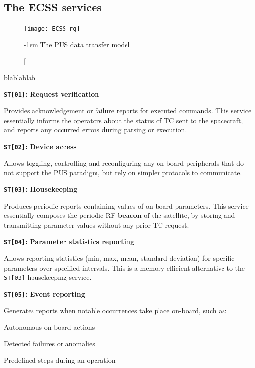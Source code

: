 \documentclass[a4paper,nobib]{tufte-book}
\begin{document}
\subsection{The \acs{ECSS} services}

\begin{figure}
	\texttt{[image: ECSS-rq]}
	\caption[][-1em]{The \ac{PUS} data transfer model}
	\label{fig:pusmodel}
\end{figure}

blablablab \autocite{ECSS-E-ST-70-41C,ECSS-E-70-41A,kaufeler_esa_standard_1994}

\begin{compactitem}
	\item \textbf{\texttt{ST[01]}: Request verification}
	
	Provides acknowledgement or failure reports for executed commands. This service essentially informs the operators about the status of \ac{TC} sent to the spacecraft, and reports any occurred errors during parsing or execution.
	
	\item \textbf{\texttt{ST[02]}: Device access}
	
	Allows toggling, controlling and reconfiguring any on-board peripherals that do not support the \ac{PUS} paradigm, but rely on simpler protocols to communicate.
	
	\item \textbf{\texttt{ST[03]}: Housekeeping}
	
	Produces periodic reports containing values of on-board parameters. This service essentially composes the periodic \acs{RF} \textbf{beacon} of the satellite, by storing and transmitting parameter values without any prior \acs{TC} request.
	
	\item \textbf{\texttt{ST[04]}: Parameter statistics reporting}
	
	Allows reporting statistics (min, max, mean, standard deviation) for specific parameters over specified intervals. This is a memory-efficient alternative to the \texttt{ST[03]} housekeeping service.
	
	\item \textbf{\texttt{ST[05]}: Event reporting}
	
	Generates reports when notable occurrences take place on-board, such as:
	\begin{compactitem}
		\item Autonomous on-board actions
		\item Detected failures or anomalies
		\item Predefined steps during an operation
	\end{compactitem}
	

\end{compactitem}
\end{document}

